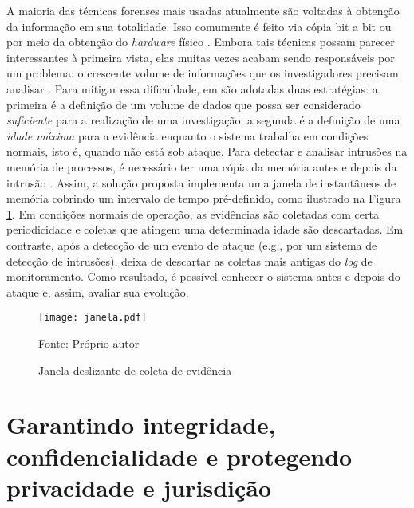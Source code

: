 A maioria das técnicas forenses mais usadas atualmente são voltadas à obtenção da informação em sua totalidade.
%
Isso comumente é feito via cópia bit a bit ou por meio da obtenção do \textit{hardware} físico \cite{SimouCloudChlng:2014} \cite{BemPastPresentFuture:2008}. 
%
Embora tais técnicas possam parecer interessantes à primeira vista, elas muitas vezes acabam sendo responsáveis por um problema: o crescente volume de informações que os investigadores precisam analisar \cite{QuickIncreaseVolumeImpact:2014}.
%
Para mitigar essa dificuldade, em \fancyname são adotadas duas estratégias: a primeira é a definição de um volume de dados que possa ser considerado \textit{suficiente} para a realização de uma investigação; a segunda é a definição de uma \textit{idade máxima} para a evidência enquanto o sistema trabalha em condições normais, isto é, quando não está sob ataque.
%
Para detectar e analisar intrusões na memória de processos, é necessário ter uma cópia da memória antes e depois da intrusão \cite{CaseMemoryForensics:2014}. 
%
Assim, a solução proposta implementa uma janela de instantâneos de memória cobrindo um intervalo de tempo pré-definido, como ilustrado na Figura \ref{fig:janela}. 
%
Em condições normais de operação, as evidências são coletadas com certa periodicidade e coletas que atingem uma determinada idade são descartadas.
%
Em contraste, após a detecção de um evento de ataque (e.g., por um sistema de detecção de intrusões), \fancyname deixa de descartar as coletas mais antigas do \textit{log} de monitoramento.
%
Como resultado, é possível conhecer o sistema antes e depois do ataque e, assim, avaliar sua evolução.
%
%

\begin{figure}[htb!]
\footnotesize
\caption{Janela deslizante de coleta de evidência}
\texttt{[image: janela.pdf]}
\centering
\label{fig:janela}
\begin{center}
Fonte: Próprio autor 
\end{center}
\end{figure}

\section{Garantindo integridade, confidencialidade e protegendo privacidade e jurisdição}
\label{sec:proposal-desc-chain-of-custody}

